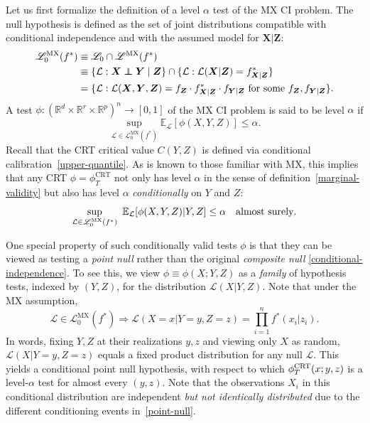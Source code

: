 \documentclass[12pt]{article}
\theoremstyle{definition}
\theoremstyle{remark}
\def\independenT#1#2{\mathrel{\rlap{$#1#2$}\mkern2mu{#1#2}}}
\newcommand\independent{\protect\mathpalette{\protect\independenT}{\perp}}
\newcommand{\prx}{\bm X}
\newcommand{\srx}{X}
\newcommand{\sfx}{x}
\newcommand{\prz}{\bm Z}
\newcommand{\srz}{Z}
\newcommand{\sfz}{z}
\newcommand{\pry}{{\bm Y}}
\newcommand{\sry}{Y}
\newcommand{\sfy}{y}
\def\CRT{\textnormal{CRT}}
\begin{document}
Let us first formalize the definition of a level $\alpha$ test of the MX CI problem. The null hypothesis is defined as the set of joint distributions compatible with conditional independence and with the assumed model for $\prx|\prz$:
\begin{equation}
	\label{eq:null-under-modelX}
	\begin{split}
		\mathscr L^{\text{MX}}_0(f^*) &\equiv \mathscr L_0 \cap \mathscr L^{\text{MX}}(f^*) \\
		&\equiv \{\mathcal L: \prx \independent \pry \mid \prz\} \cap \{\mathcal L: \mathcal L(\prx|\prz) = f^*_{\prx|\prz}\}\\
		&= \{\mathcal L: \mathcal L(\prx,\pry,\prz) = f_{\prz} \cdot f^*_{\prx|\prz} \cdot f_{\pry|\prz} \text{ for some } f_{\prz}, f_{\pry|\prz} \}.
	\end{split}
\end{equation}
A test $\phi: (\mathbb R^{d} \times \mathbb R^r \times \mathbb R^p)^n \rightarrow [0,1]$ of the MX CI problem is said to be level $\alpha$ if
\begin{equation}
	\sup_{\mathcal L \in \mathscr L^{\text{MX}}_0(f^*)} \mathbb E_{\mathcal L}[\phi(\srx, \sry, \srz)] \leq \alpha.
	\label{marginal-validity}
\end{equation}
Recall that the CRT critical value $C(\sry, \srz)$ is defined via conditional calibration~\eqref{upper-quantile}. As is known to those familiar with MX, this implies that any CRT $\phi = \phi_T^{\text{CRT}}$ not only has level $\alpha$ in the sense of definition~\eqref{marginal-validity} but also has level $\alpha$ \textit{conditionally} on $\sry$ and $\srz$:
\begin{equation}
\sup_{\mathcal L \in \mathscr L_0^{\textnormal{MX}}(f^*)}\ \mathbb E_{\mathcal L}[\phi(\srx, \sry, \srz)|\sry, \srz] \leq \alpha \quad \text{almost surely}.
\label{eq:conditional-validity}
\end{equation}

One special property of such conditionally valid tests $\phi$ is that they can be viewed as testing a \textit{point null} rather than the original \textit{composite null} \eqref{conditional-independence}. To see this, we view $\phi \equiv \phi(\srx;\sry,\srz)$ as a \textit{family} of hypothesis tests, indexed by $(\sry, \srz)$, for the distribution $\mathcal L(\srx|\sry,\srz)$. Note that under the MX assumption,
\small
\begin{equation}
\mathcal L \in \mathscr L_0^{\text{MX}}(f^*) \Longrightarrow \mathcal L(\srx = \sfx|\sry = \sfy, \srz = \sfz) = \prod_{i = 1}^n  f^*(\sfx_i | \sfz_i).
\label{point-null}
\end{equation}
\normalsize
In words, fixing $Y,Z$ at their realizations $\sfy,\sfz$ and viewing only $\srx$ as random, $\mathcal L(\srx|\sry = \sfy, \srz = \sfz)$ equals a fixed product distribution for any null $\mathcal L$. This yields a conditional point null hypothesis, with respect to which $\phi^{\CRT}_T(\sfx;\sfy,\sfz)$ is a level-$\alpha$ test for almost every $(\sfy, \sfz)$. Note that the observations $\srx_i$ in this conditional distribution are independent \textit{but not identically distributed} due to the different conditioning events in~\eqref{point-null}.
\end{document}
